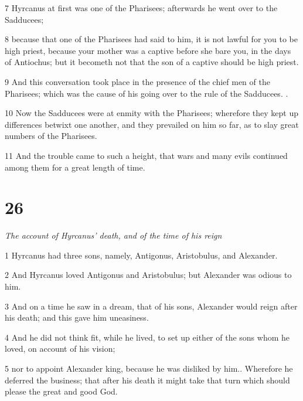 \par 7 Hyrcanus at first was one of the Pharisees; afterwards he went over to the Sadducees; 

\par 8 because that one of the Pharisees had said to him, it is not lawful for you to be high priest, because your mother was a captive before she bare you, in the days of Antiochus; but it becometh not that the son of a captive should be high priest.

\par 9 And this conversation took place in the presence of the chief men of the Pharisees; which was the cause of his going over to the rule of the Sadducees. .

\par 10 Now the Sadducees were at enmity with the Pharisees; wherefore they kept up differences betwixt one another, and they prevailed on him so far, as to slay great numbers of the Pharisees. 

\par 11 And the trouble came to such a height, that wars and many evils continued among them for a great length of time. 

\chapter{26}

\par \textit{The account of Hyrcanus’ death, and of the time of his reign}

\par 1 Hyrcanus had three sons, namely, Antigonus, Aristobulus, and Alexander. 

\par 2 And Hyrcanus loved Antigonus and Aristobulus; but Alexander was odious to him. 

\par 3 And on a time he saw in a dream, that of his sons, Alexander would reign after his death; and this gave him uneasiness. 

\par 4 And he did not think fit, while he lived, to set up either of the sons whom he loved, on account of his vision; 

\par 5 nor to appoint Alexander king, because he was disliked by him.. Wherefore he deferred the business; that after his death it might take that turn which should please the great and good God. 

